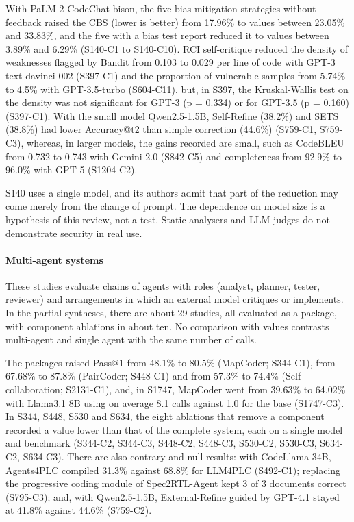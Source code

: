 With PaLM-2-CodeChat-bison, the five bias mitigation strategies without feedback raised the CBS (lower is better) from 17.96\% to values between 23.05\% and 33.83\%, and the five with a bias test report reduced it to values between 3.89\% and 6.29\% (S140-C1 to S140-C10).
RCI self-critique reduced the density of weaknesses flagged by Bandit from 0.103 to 0.029 per line of code with GPT-3 text-davinci-002 (S397-C1) and the proportion of vulnerable samples from 5.74\% to 4.5\% with GPT-3.5-turbo (S604-C11), but, in S397, the Kruskal-Wallis test on the density was not significant for GPT-3 (p = 0.334) or for GPT-3.5 (p = 0.160) (S397-C1).
With the small model Qwen2.5-1.5B, Self-Refine (38.2\%) and SETS (38.8\%) had lower Accuracy@t2 than simple correction (44.6\%) (S759-C1, S759-C3), whereas, in larger models, the gains recorded are small, such as CodeBLEU from 0.732 to 0.743 with Gemini-2.0 (S842-C5) and completeness from 92.9\% to 96.0\% with GPT-5 (S1204-C2).

S140 uses a single model, and its authors admit that part of the reduction may come merely from the change of prompt. The dependence on model size is a hypothesis of this review, not a test. Static analysers and LLM judges do not demonstrate security in real use.

\paragraph{Multi-agent systems}
These studies evaluate chains of agents with roles (analyst, planner, tester, reviewer) and arrangements in which an external model critiques or implements. In the partial syntheses, there are about 29 studies, all evaluated as a package, with component ablations in about ten. No comparison with values contrasts multi-agent and single agent with the same number of calls.

The packages raised Pass@1 from 48.1\% to 80.5\% (MapCoder; S344-C1), from 67.68\% to 87.8\% (PairCoder; S448-C1) and from 57.3\% to 74.4\% (Self-collaboration; S2131-C1), and, in S1747, MapCoder went from 39.63\% to 64.02\% with Llama3.1 8B using on average 8.1 calls against 1.0 for the base (S1747-C3).
In S344, S448, S530 and S634, the eight ablations that remove a component recorded a value lower than that of the complete system, each on a single model and benchmark (S344-C2, S344-C3, S448-C2, S448-C3, S530-C2, S530-C3, S634-C2, S634-C3).
There are also contrary and null results: with CodeLlama 34B, Agents4PLC compiled 31.3\% against 68.8\% for LLM4PLC (S492-C1); replacing the progressive coding module of Spec2RTL-Agent kept 3 of 3 documents correct (S795-C3); and, with Qwen2.5-1.5B, External-Refine guided by GPT-4.1 stayed at 41.8\% against 44.6\% (S759-C2).


